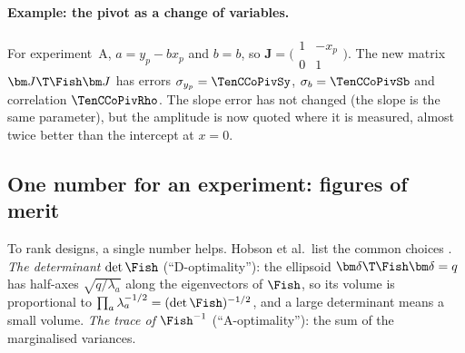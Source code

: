 \paragraph{Example: the pivot as a change of variables.} For experiment~A, $a=y_p-bx_p$ and $b=b$, so
$\bm J=\bigl(\begin{smallmatrix}1&-x_p\\0&1\end{smallmatrix}\bigr)$. The new matrix $\bm J\T\Fish\bm J$ has errors
$\sigma_{y_p}=\TenCCoPivSy$, $\sigma_b=\TenCCoPivSb$ and correlation $\TenCCoPivRho$. The slope error has not
changed (the slope is the same parameter), but the amplitude is now quoted where it is measured, almost twice
better than the intercept at $x=0$.

\subsection{One number for an experiment: figures of merit}
\label{10a:sec:fom}

To rank designs, a single number helps. Hobson et al.\ list the common choices .
\emph{The determinant} $\det\Fish$ (``D-optimality''): the ellipsoid $\bm\delta\T\Fish\bm\delta=q$ has half-axes $\sqrt{q/\lambda_a}$
along the eigenvectors of $\Fish$, so its volume is proportional to $\prod_a\lambda_a^{-1/2}=(\det\Fish)^{-1/2}$, and a large
determinant means a small volume. \emph{The trace of $\Fish^{-1}$} (``A-optimality''): the sum of the marginalised
variances.

